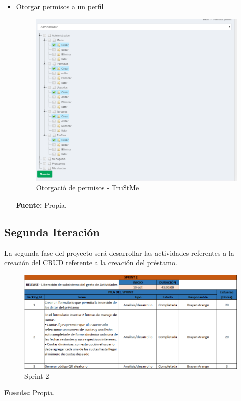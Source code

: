 {{\begin{itemize}
		\item Otorgar permisos a un perfil
		\begin{figure}[H]
			\centering
			\includegraphics[width=1\linewidth]{development/otorgarpermisos.png}
			\caption{Otorgació de permisos - Tru\$tMe}
		\end{figure}
		\begin{center}
			\textbf{Fuente:} Propia.
		\end{center}
		
		 
	\end{itemize}
		

		
	}

		\subsection{Segunda Iteración}
		{La segunda fase del proyecto será desarrollar las actividades referentes a la creación del CRUD referente a la creación del préstamo.\\
			
			\begin{figure}[H]
				\centering
				\includegraphics[width=1\linewidth]{development/sprint2.png}
				\caption{Sprint 2}
			\end{figure}
			\begin{center}
				\textbf{Fuente:} Propia.
			\end{center}
			
}}
